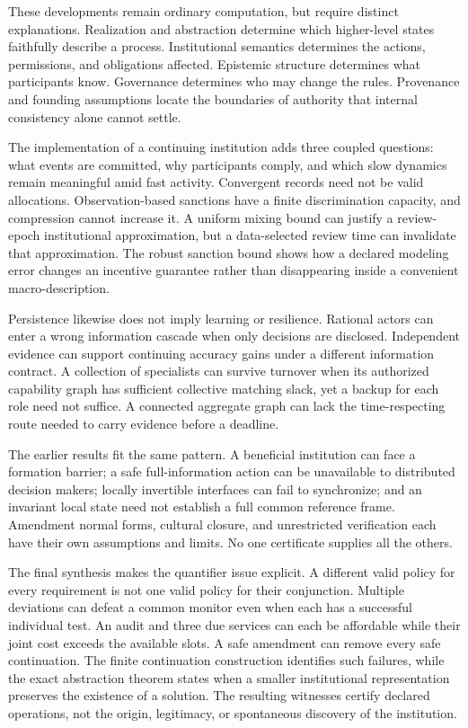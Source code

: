 \documentclass[11pt,letterpaper]{article}
\theoremstyle{plain}
\theoremstyle{definition}
\theoremstyle{remark}
\begin{document}
These developments remain ordinary computation, but require distinct explanations. Realization and abstraction determine which higher-level states faithfully describe a process. Institutional semantics determines the actions, permissions, and obligations affected. Epistemic structure determines what participants know. Governance determines who may change the rules. Provenance and founding assumptions locate the boundaries of authority that internal consistency alone cannot settle.

The implementation of a continuing institution adds three coupled questions: what events are committed, why participants comply, and which slow dynamics remain meaningful amid fast activity. Convergent records need not be valid allocations. Observation-based sanctions have a finite discrimination capacity, and compression cannot increase it. A uniform mixing bound can justify a review-epoch institutional approximation, but a data-selected review time can invalidate that approximation. The robust sanction bound shows how a declared modeling error changes an incentive guarantee rather than disappearing inside a convenient macro-description.

Persistence likewise does not imply learning or resilience. Rational actors can enter a wrong information cascade when only decisions are disclosed. Independent evidence can support continuing accuracy gains under a different information contract. A collection of specialists can survive turnover when its authorized capability graph has sufficient collective matching slack, yet a backup for each role need not suffice. A connected aggregate graph can lack the time-respecting route needed to carry evidence before a deadline.

The earlier results fit the same pattern. A beneficial institution can face a formation barrier; a safe full-information action can be unavailable to distributed decision makers; locally invertible interfaces can fail to synchronize; and an invariant local state need not establish a full common reference frame. Amendment normal forms, cultural closure, and unrestricted verification each have their own assumptions and limits. No one certificate supplies all the others.

The final synthesis makes the quantifier issue explicit. A different valid policy for every requirement is not one valid policy for their conjunction. Multiple deviations can defeat a common monitor even when each has a successful individual test. An audit and three due services can each be affordable while their joint cost exceeds the available slots. A safe amendment can remove every safe continuation. The finite continuation construction identifies such failures, while the exact abstraction theorem states when a smaller institutional representation preserves the existence of a solution. The resulting witnesses certify declared operations, not the origin, legitimacy, or spontaneous discovery of the institution.
\end{document}

